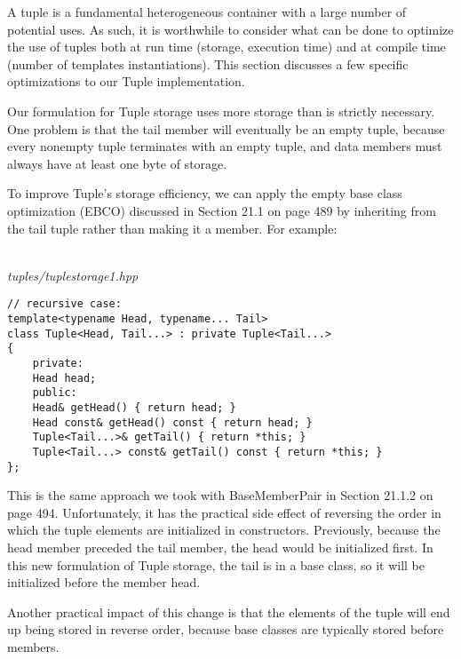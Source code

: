 
A tuple is a fundamental heterogeneous container with a large number of potential uses. As such, it is worthwhile to consider what can be done to optimize the use of tuples both at run time (storage, execution time) and at compile time (number of templates instantiations). This section discusses a few specific optimizations to our Tuple implementation.


Our formulation for Tuple storage uses more storage than is strictly necessary. One problem is that the tail member will eventually be an empty tuple, because every nonempty tuple terminates with an empty tuple, and data members must always have at least one byte of storage.

To improve Tuple’s storage efficiency, we can apply the empty base class optimization (EBCO) discussed in Section 21.1 on page 489 by inheriting from the tail tuple rather than making it a member. For example:

\hspace*{\fill} \\ %
\noindent
\textit{tuples/tuplestorage1.hpp}
\begin{lstlisting}[style=styleCXX]
// recursive case:
template<typename Head, typename... Tail>
class Tuple<Head, Tail...> : private Tuple<Tail...>
{
	private:
	Head head;
	public:
	Head& getHead() { return head; }
	Head const& getHead() const { return head; }
	Tuple<Tail...>& getTail() { return *this; }
	Tuple<Tail...> const& getTail() const { return *this; }
};
\end{lstlisting}

This is the same approach we took with BaseMemberPair in Section 21.1.2 on page 494. Unfortunately, it has the practical side effect of reversing the order in which the tuple elements are initialized
in constructors. Previously, because the head member preceded the tail member, the head would be initialized first. In this new formulation of Tuple storage, the tail is in a base class, so it will be initialized before the member head.

\begin{tcolorbox}[colback=webgreen!5!white,colframe=webgreen!75!black]
\hspace*{0.75cm}Another practical impact of this change is that the elements of the tuple will end up being stored in reverse order, because base classes are typically stored before members.
\end{tcolorbox}


